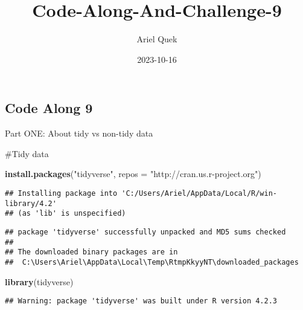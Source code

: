 \documentclass[
]{article}
\title{Code-Along-And-Challenge-9}
\author{Ariel Quek}
\date{2023-10-16}
\newenvironment{Shaded}{\begin{snugshade}}{\end{snugshade}}
\newcommand{\AttributeTok}[1]{\textcolor[rgb]{0.13,0.29,0.53}{#1}}
\newcommand{\ConstantTok}[1]{\textcolor[rgb]{0.56,0.35,0.01}{#1}}
\newcommand{\FunctionTok}[1]{\textcolor[rgb]{0.13,0.29,0.53}{\textbf{#1}}}
\newcommand{\NormalTok}[1]{#1}
\newcommand{\SpecialCharTok}[1]{\textcolor[rgb]{0.81,0.36,0.00}{\textbf{#1}}}
\newcommand{\StringTok}[1]{\textcolor[rgb]{0.31,0.60,0.02}{#1}}
\begin{document}
\maketitle

\begin{Shaded}
\end{Shaded}

\hypertarget{code-along-9}{%
\subsection{Code Along 9}\label{code-along-9}}

Part ONE: About tidy vs non-tidy data

\#Tidy data

\begin{Shaded}
\begin{Highlighting}[]
\FunctionTok{install.packages}\NormalTok{(}\StringTok{"tidyverse"}\NormalTok{, }\AttributeTok{repos =} \StringTok{"http://cran.us.r{-}project.org"}\NormalTok{)}
\end{Highlighting}
\end{Shaded}

\begin{verbatim}
## Installing package into 'C:/Users/Ariel/AppData/Local/R/win-library/4.2'
## (as 'lib' is unspecified)
\end{verbatim}

\begin{verbatim}
## package 'tidyverse' successfully unpacked and MD5 sums checked
## 
## The downloaded binary packages are in
##  C:\Users\Ariel\AppData\Local\Temp\RtmpKkyyNT\downloaded_packages
\end{verbatim}

\begin{Shaded}
\begin{Highlighting}[]
\FunctionTok{library}\NormalTok{(tidyverse)}
\end{Highlighting}
\end{Shaded}

\begin{verbatim}
## Warning: package 'tidyverse' was built under R version 4.2.3
\end{verbatim}
\end{document}
